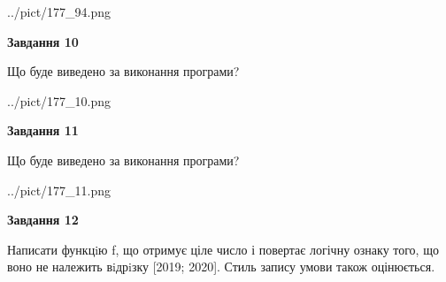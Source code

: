 \documentclass[12pt, ukrainian]{article}
\begin{document}
{\begin {large}
\begin{center}
	{../pict/177_94.png}
\end{center}
\newpage

{\begin {center}\textbf{Завдання 10}\end {center}}

Що буде виведено за виконання програми?\par
\begin{center}
	{../pict/177_10.png}
\end{center}
\newpage

{\begin {center}\textbf{Завдання 11}\end {center}}

Що буде виведено за виконання програми?\par
\begin{center}
	{../pict/177_11.png}
\end{center}
\newpage

{\begin {center}\textbf{Завдання 12}\end {center}}


Написати функцiю f, що отримує ціле число і повертає логічну ознаку того, що воно не належить вiдрiзку [2019; 2020]. Стиль запису умови також оцінюється.\par
\newpage

\end {large}}
\end{document}
